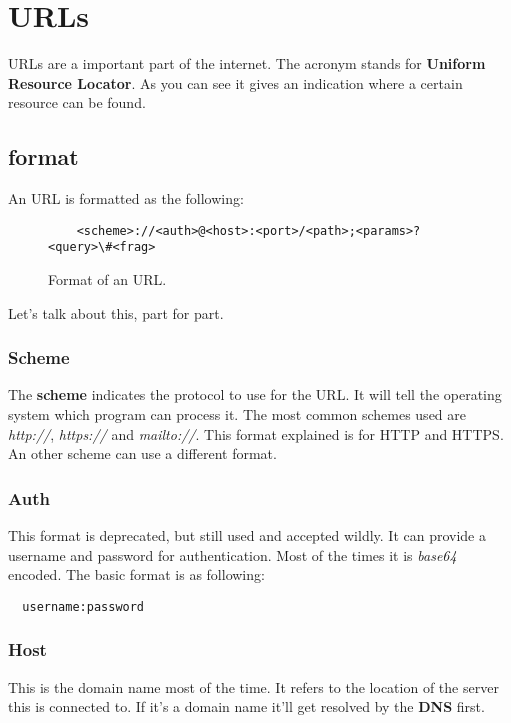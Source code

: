 \section{URLs}

URLs are a important part of the internet.
The acronym stands for {\bf Uniform Resource Locator}.
As you can see it gives an indication where a certain resource can be found.

\subsection{format}
An URL is formatted as the following:

\begin{figure}[h]
  \caption{Format of an URL.}
  \begin{verbatim}
    <scheme>://<auth>@<host>:<port>/<path>;<params>?<query>\#<frag>
  \end{verbatim}
\end{figure}

Let's talk about this, part for part.

\subsubsection{Scheme}
The {\bf scheme} indicates the protocol to use for the URL\@.
It will tell the operating system which program can process it.
The most common schemes used are {\it http://}, {\it https://} and {\it mailto://}.
This format explained is for HTTP and HTTPS\@.
An other scheme can use a different format.

\subsubsection{Auth}
This format is deprecated, but still used and accepted wildly.
It can provide a username and password for authentication.
Most of the times it is {\it base64} encoded.
The basic format is as following:

\begin{verbatim}
  username:password
\end{verbatim}

\subsubsection{Host}
This is the domain name most of the time.
It refers to the location of the server this is connected to.
If it's a domain name it'll get resolved by the {\bf DNS} first.

